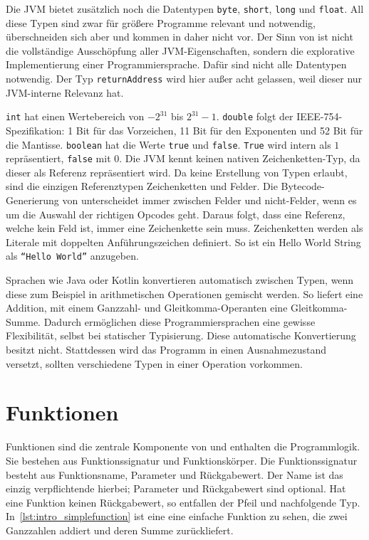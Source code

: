 Die JVM bietet zusätzlich noch die Datentypen \texttt{byte}, \texttt{short}, \texttt{long} und \texttt{float}. All diese Typen sind zwar für größere Programme relevant und notwendig, überschneiden sich aber und kommen in \toya daher nicht vor. Der Sinn von \toya ist nicht die vollständige Ausschöpfung aller JVM-Eigenschaften, sondern die explorative Implementierung einer Programmiersprache. Dafür sind nicht alle Datentypen notwendig. Der Typ \texttt{returnAddress} wird hier außer acht gelassen, weil dieser nur JVM-interne Relevanz hat.

\texttt{int} hat einen Wertebereich von $-2^{31}$ bis $2^{31} - 1$. \texttt{double} folgt der IEEE-754-Spezifikation: 1 Bit für das Vorzeichen, 11 Bit für den Exponenten und 52 Bit für die Mantisse. \texttt{boolean} hat die Werte \texttt{true} und \texttt{false}. \texttt{True} wird intern als $1$ repräsentiert, \texttt{false} mit 0. Die JVM kennt keinen nativen Zeichenketten-Typ, da dieser als Referenz repräsentiert wird. Da \toya keine Erstellung von Typen erlaubt, sind die einzigen Referenztypen Zeichenketten und Felder. Die Bytecode-Generierung von \toya unterscheidet immer zwischen Felder und nicht-Felder, wenn es um die Auswahl der richtigen Opcodes geht. Daraus folgt, dass eine Referenz, welche kein Feld ist, immer eine Zeichenkette sein muss. Zeichenketten werden als Literale mit doppelten Anführungszeichen definiert. So ist ein Hello World String als \texttt{``Hello World''} anzugeben.

Sprachen wie Java oder Kotlin konvertieren automatisch zwischen Typen, wenn diese zum Beispiel in arithmetischen Operationen gemischt werden. So liefert eine Addition, mit einem Ganzzahl- und Gleitkomma-Operanten eine Gleitkomma-Summe. Dadurch ermöglichen diese Programmiersprachen eine gewisse Flexibilität, selbst bei statischer Typisierung. Diese automatische Konvertierung besitzt \toya nicht. Stattdessen wird das Programm in einen Ausnahmezustand versetzt, sollten verschiedene Typen in einer Operation vorkommen.

\section{Funktionen}

Funktionen sind die zentrale Komponente von \toya und enthalten die Programmlogik. Sie bestehen aus Funktionssignatur und Funktionskörper. Die Funktionssignatur besteht aus Funktionsname, Parameter und Rückgabewert. Der Name ist das einzig verpflichtende hierbei; Parameter und Rückgabewert sind optional. Hat eine Funktion keinen Rückgabewert, so entfallen der Pfeil und nachfolgende Typ. In~\autoref{lst:intro_simplefunction} ist eine eine einfache Funktion zu sehen, die zwei Ganzzahlen addiert und deren Summe zurückliefert.

